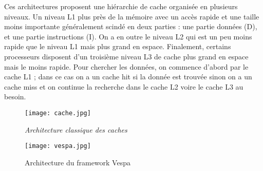 Ces architectures proposent une hiérarchie de cache organisée en plusieurs niveaux. Un niveau L1 plus près de la mémoire avec un accès rapide et une  taille moins importante généralement scindé en deux parties : une partie données (D), et une partie  instructions (I). On a en outre le niveau L2 qui est un peu moins rapide que  le niveau L1 mais plus grand en espace. Finalement, certains processeurs disposent d’un troisième niveau L3 de cache plus grand en espace mais le moins rapide.  Pour chercher les données, on commence   d’abord par le cache L1 ; dans ce cas on a un cache hit si la donnée est trouvée sinon on a un cache miss et on continue la recherche dans le cache L2 voire le cache  L3 au besoin.

\begin{figure}[h!]
   \begin{minipage}[b]{0.50\linewidth}
      \centering \texttt{[image: cache.jpg]}
      \caption{\it Architecture classique des caches}
   \end{minipage}\hfill
   \begin{minipage}[b]{0.50\linewidth}   
      \centering \texttt{[image: vespa.jpg]}
      \caption{Architecture du framework Vespa \cite{Vespa}}       
   \end{minipage}
\end{figure}      
% 
% 
% 



